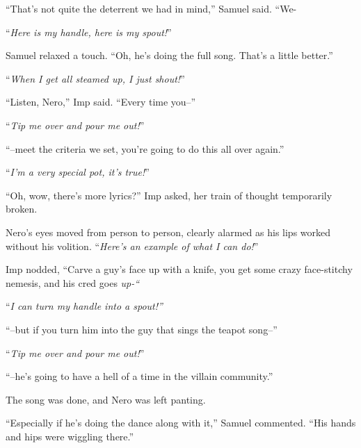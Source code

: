 ``That's not quite the deterrent we had in mind,'' Samuel said.  ``We-



``\emph{Here is my handle, here is my spout!}''



Samuel relaxed a touch.  ``Oh, he's doing the full song.  That's a little better.''



``\emph{When I get all steamed up, I just shout!}''



``Listen, Nero,''  Imp said.  ``Every time you--''



``\emph{Tip me over and pour me out!}''



``--meet the criteria we set, you're going to do this all over again.''



``\emph{I'm a very special pot, it's true!}''



``Oh, wow, there's more lyrics?'' Imp asked, her train of thought temporarily broken.



Nero's eyes moved from person to person, clearly alarmed as his lips worked without his volition.  ``\emph{Here's an example of what I can do!}''



Imp nodded, ``Carve a guy's face up with a knife, you get some crazy face-stitchy nemesis, and his cred goes \emph{up-``}



``\emph{I can turn my handle into a spout!''}



``--but if you turn him into the guy that sings the teapot song--''



``\emph{Tip me over and pour me out!}''



``--he's going to have a hell of a time in the villain community.''



The song was done, and Nero was left panting.



``Especially if he's doing the dance along with it,'' Samuel commented.  ``His hands and hips were wiggling there.''



